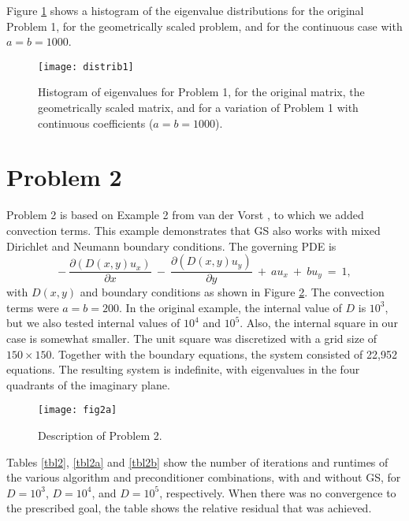 \documentclass[12pt,a4paper]{article}
\newcounter{i}
\def\time{\!\times\!}
\begin{document}
Figure \ref{dist1} shows a histogram of the eigenvalue distributions 
for the original Problem 1, for the geometrically scaled problem, and 
for the continuous case with $a=b=1000$.

\begin{figure}[!h]
\centering
\texttt{[image: distrib1]}
\vspace{-.1in}
\caption{Histogram of eigenvalues for Problem 1, for the original
matrix, the geometrically scaled matrix, and for a variation of 
Problem 1 with continuous coefficients ($a=b=1000$).}
\label{dist1}
\end{figure}





\section{Problem 2}
\label{prob2}

Problem 2 is based on Example 2 from van der Vorst \cite{Vorst92}, 
to which we added convection terms.  This example demonstrates that 
GS also works with mixed Dirichlet and Neumann boundary conditions.  
The governing PDE is
\[
-~ \frac{\partial(D(x,y)u_x)}{\partial x} ~-~
   \frac{\partial(D(x,y)u_y)}{\partial y} ~+~
   a u_x ~+~ b u_y ~=~ 1,
\label{eq2}
\]
with $D(x,y)$ and boundary conditions as shown in Figure \ref{fig2}.  
The convection terms were $a=b=200$.
In the original example, the internal value of $D$ is $10^3$, but
we also tested internal values of $10^4$ and $10^5$.  Also, the 
internal square in our case is somewhat smaller.
The unit square was discretized with a grid size of $150\time 150$.
Together with the boundary equations, the system consisted of 22,952
equations.  The resulting system is indefinite, with eigenvalues in 
the four quadrants of the imaginary plane.

\begin{figure}[!h]
\centering
\texttt{[image: fig2a]}
\caption{Description of Problem 2.}
\label{fig2}
\end{figure}

Tables \ref{tbl2}, \ref{tbl2a} and \ref{tbl2b} show the number of 
iterations and runtimes of the various algorithm and preconditioner 
combinations, with and without GS, for $D=10^3$, $D=10^4$, and
$D=10^5$, respectively.  When there was no convergence to the 
prescribed goal, the table shows the relative residual that was 
achieved.  
\end{document}
